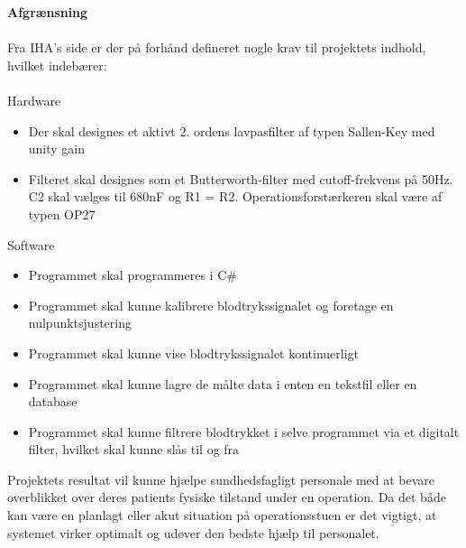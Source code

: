 \textbf{Afgrænsning}\\ \\
Fra IHA’s side er der på forhånd defineret nogle krav til projektets indhold, hvilket indebærer:\\ \\
Hardware
\begin{itemize}
	\item Der skal designes et aktivt 2. ordens lavpasfilter af typen Sallen-Key med unity gain
	\item Filteret skal designes som et Butterworth-filter med cutoff-frekvens på 50Hz. C2 skal vælges til 680nF og R1 = R2. Operationsforstærkeren skal være af typen OP27
\end{itemize}
Software 
\begin{itemize}
	\item Programmet skal programmeres i C\#
	\item Programmet skal kunne kalibrere blodtrykssignalet og foretage en nulpunktsjustering
	\item Programmet skal kunne vise blodtrykssignalet kontinuerligt
	\item Programmet skal kunne lagre de målte data i enten en tekstfil eller en database
	\item Programmet skal kunne filtrere blodtrykket i selve programmet via et digitalt filter, hvilket skal kunne slås til og fra
\end{itemize}


Projektets resultat vil kunne hjælpe sundhedsfagligt personale med at bevare overblikket over deres patients fysiske tilstand under en operation. Da det både kan være en planlagt eller akut situation på operationsstuen er det vigtigt, at systemet virker optimalt og udøver den bedste hjælp til personalet.
